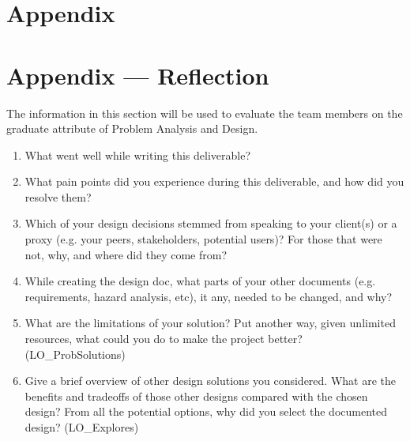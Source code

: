 \documentclass[12pt, titlepage]{article}
\begin{document}
\newpage

\section{Appendix} \label{Appendix}


\newpage{}

\section*{Appendix --- Reflection}


The information in this section will be used to evaluate the team members on the
graduate attribute of Problem Analysis and Design.



\begin{enumerate}
  \item What went well while writing this deliverable? 
  \item What pain points did you experience during this deliverable, and how
    did you resolve them?
  \item Which of your design decisions stemmed from speaking to your client(s)
  or a proxy (e.g. your peers, stakeholders, potential users)? For those that
  were not, why, and where did they come from?
  \item While creating the design doc, what parts of your other documents (e.g.
  requirements, hazard analysis, etc), it any, needed to be changed, and why?
  \item What are the limitations of your solution?  Put another way, given
  unlimited resources, what could you do to make the project better? (LO\_ProbSolutions)
  \item Give a brief overview of other design solutions you considered.  What
  are the benefits and tradeoffs of those other designs compared with the chosen
  design?  From all the potential options, why did you select the documented design?
  (LO\_Explores)
\end{enumerate}
\end{document}
